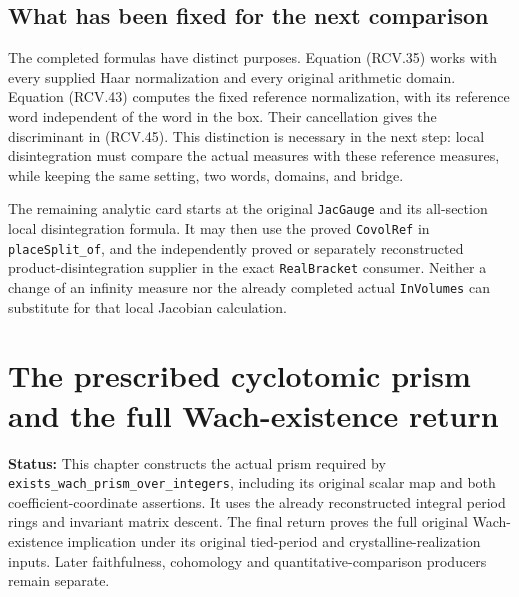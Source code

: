 \documentclass[11pt,a4paper]{article}
\numberwithin{equation}{section}
\theoremstyle{remark}\newtheorem{remark}[theorem]{Remark}
\newcommand{\status}[1]{\textbf{Status:} #1}
\begin{document}
\subsection{What has been fixed for the next comparison}

The completed formulas have distinct purposes.  Equation (RCV.35)
works with every supplied Haar normalization and every original
arithmetic domain.  Equation (RCV.43) computes the fixed reference
normalization, with its reference word independent of the word in
the box.  Their cancellation gives the discriminant in (RCV.45).
This distinction is necessary in the next step: local disintegration
must compare the actual measures with these reference measures,
while keeping the same setting, two words, domains, and bridge.

The remaining analytic card starts at the original
\texttt{Jac\allowbreak Gauge} and its all-section local disintegration formula.
It may then use the proved \texttt{Covol\allowbreak Ref} in
\texttt{place\allowbreak Split\_\allowbreak of}, and the independently proved or separately
reconstructed product-disintegration supplier in the exact
\texttt{Real\allowbreak Bracket} consumer.  Neither a change of an infinity
measure nor the already completed actual \texttt{In\allowbreak Volumes}
can substitute for that local Jacobian calculation.


\section{The prescribed cyclotomic prism and the full Wach-existence return}
\label{sec:wach-prism-v056}

\status{This chapter constructs the actual prism required by
\texttt{exists\_\allowbreak wach\_\allowbreak prism\_\allowbreak over\_\allowbreak integers}, including its original
scalar map and both coefficient-coordinate assertions. It uses the
already reconstructed integral period rings and invariant matrix
descent. The final return proves the full original Wach-existence
implication under its original tied-period and crystalline-realization
inputs. Later faithfulness, cohomology and quantitative-comparison
producers remain separate.}
\end{document}
